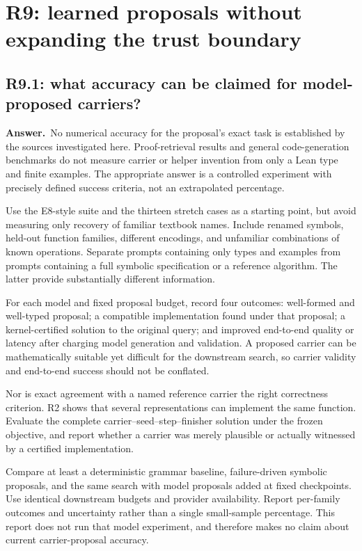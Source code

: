 \documentclass[11pt,a4paper]{article}
\theoremstyle{definition}
\theoremstyle{remark}
\newcommand{\ans}{\noindent\textbf{Answer.}\ }
\begin{document}
\section{R9: learned proposals without expanding the trust boundary}\label{sec:r9}

\subsection{R9.1: what accuracy can be claimed for model-proposed carriers?}\label{q:R9.1}
\ans No numerical accuracy for the proposal's exact task is established by the
sources investigated here. Proof-retrieval results and general code-generation
benchmarks do not measure carrier or helper invention from only a Lean type
and finite examples. The appropriate answer is a controlled experiment with
precisely defined success criteria, not an extrapolated percentage.

Use the E8-style suite and the thirteen stretch cases as a starting point,
but avoid measuring only recovery of familiar textbook names. Include renamed
symbols, held-out function families, different encodings, and unfamiliar
combinations of known operations. Separate prompts containing only types and
examples from prompts containing a full symbolic specification or a reference
algorithm. The latter provide substantially different information.

For each model and fixed proposal budget, record four outcomes: well-formed
and well-typed proposal; a compatible implementation found under that proposal;
a kernel-certified solution to the original query; and improved end-to-end
quality or latency after charging model generation and validation. A proposed
carrier can be mathematically suitable yet difficult for the downstream
search, so carrier validity and end-to-end success should not be conflated.

Nor is exact agreement with a named reference carrier the right correctness
criterion. R2 shows that several representations can implement the same
function. Evaluate the complete carrier--seed--step--finisher solution under
the frozen objective, and report whether a carrier was merely plausible or
actually witnessed by a certified implementation.

Compare at least a deterministic grammar baseline, failure-driven symbolic
proposals, and the same search with model proposals added at fixed checkpoints.
Use identical downstream budgets and provider availability. Report per-family
outcomes and uncertainty rather than a single small-sample percentage. This
report does not run that model experiment, and therefore makes no claim about
current carrier-proposal accuracy.
\end{document}
